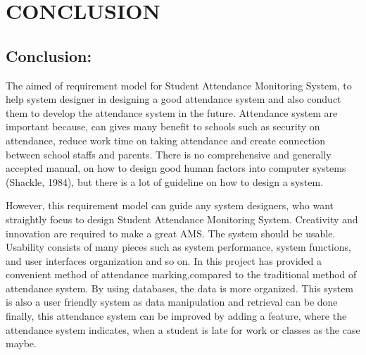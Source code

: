 \chapter{CONCLUSION}

\section{Conclusion: }
The aimed of requirement model for Student Attendance Monitoring System, to help system designer in designing a good attendance system and also conduct them to develop the attendance system in the future. Attendance system are important because, can gives many benefit to schools such as security on attendance, reduce work time on taking attendance and create connection between school staffs and parents. There is no comprehensive and generally accepted manual, on how to design good human factors into computer systems (Shackle, 1984), but there is a lot of guideline on how to design a system. 

However, this requirement model can guide any system designers, who want straightly focus to design Student Attendance Monitoring System. Creativity and innovation are required to make a great AMS. The system should be usable. Usability consists of many pieces such as system performance, system functions, and user interfaces organization and so on. In this project has provided a convenient method of attendance marking,compared to the traditional method of attendance system. By using databases, the data is more organized. This system is also a user friendly system as data manipulation and retrieval can be done finally, this attendance system can be improved by adding a feature, where the attendance system indicates, when a student is late for work or classes as the case maybe.
